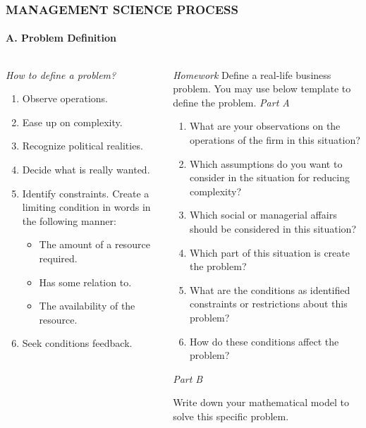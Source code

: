 \documentclass[14 pt]{beamer}
\begin{document}
\begin{frame}[t]
\frametitle{MANAGEMENT SCIENCE PROCESS}
\framesubtitle{A. Problem Definition}

\begin{columns}[t]
\begin{column}{0.45\textwidth}
\emph{How to define a problem?}
\vskip0.5cm%
\begin{enumerate}
  \item Observe operations.
  \item Ease up on complexity.
  \item Recognize political realities.
  \item Decide what is really wanted.
  \item Identify constraints.
\vskip0.5cm%
Create a limiting condition in words in the following manner:
\begin{itemize}
  \item The amount of a resource required.
  \item Has some relation to.
  \item The availability of the resource.
\end{itemize}
\vskip0.5cm%
  \item Seek conditions feedback.
\end{enumerate}
\end{column}

\begin{column}{0.45\textwidth}
\emph{Homework}
\vskip0.5cm%
Define a real-life business problem. You may use below template to define the problem.
\vskip0.5cm%
\emph{Part A}

\begin{enumerate}
  \item What are your observations on the operations of the firm in this situation?
  \item Which assumptions do you want to consider in the situation for reducing complexity?
  \item Which social or managerial affairs should be considered in this situation?
  \item Which part of this situation is create the problem?
  \item What are the conditions as identified constraints or restrictions about this problem?
  \item How do these conditions affect the problem?
\end{enumerate}
\vskip0.5cm%
\emph{Part B}

Write down your mathematical model to solve this specific problem.
\end{column}
\end{columns}
\end{frame}
\end{document}
